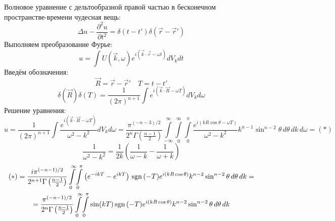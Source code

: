 Волновое уравнение с дельтообразной правой частью в бесконечном пространстве-времени чудесная вещь:
\[
	\Delta u - \frac{\partial^2 u}{\partial t^2} = \delta(t - t')\delta(\vec{r} - \vec{r}') 
\]
Выполняем преобразование Фурье:
\[
	u = \int U(\vec{k}, \omega) e^{i(\vec{k}\cdot\vec{r} - \omega t)} dV_k dt
\]
Введём обозначения:
\[
	\vec{R} = \vec{r} - \vec{r}' \quad T = t - t'
\]
\[
	\delta(\vec{R}) \delta(T) = \frac{1}{(2\pi)^{n + 1}} \int e^{i(\vec{k}\cdot\vec{R} - \omega T)} dV_k d\omega
\]
Решение уравнения:
\[
	u = \frac{1}{(2\pi)^{n + 1}} \int \frac{e^{i(\vec{k}\cdot\vec{R} - \omega T)}}{\omega^2 - k^2} dV_k d\omega =  
	\frac{\pi^{(- n - 3)/2}}{2^n\Gamma\left(\frac{n - 1}{2}\right)} 
	\int\limits_{-\infty}^{\infty}\!
	\int\limits_{0}^{\infty}\!
	\int\limits_{0}^{\pi}
	 \frac{e^{i(k R \cos \theta - \omega T)}}{\omega^2 - k^2} k^{n - 1} \sin^{n - 2} \theta\, d\theta\, dk\, d\omega = (*)
\]
\[
	\frac{1}{\omega^2 - k^2} = \frac{1}{2k} \left(\frac{1}{\omega - k} - \frac{1}{\omega + k} \right)
\]
\[
	\begin{gathered}
	(*) =
	\frac{i \pi^{(- n - 1)/2}}{2^{n + 1}\Gamma\left(\frac{n - 1}{2}\right)} 
	\int\limits_{0}^{\infty}\!
	\int\limits_{0}^{\pi}
	\left(e^{ - i k T}  - e^{i k T} \right) \mathrm{\,sgn}\,(-T)
	e^{i(k R \cos \theta)} 
	k^{n - 2} \sin^{n - 2} \theta\, d\theta\, dk
	= \\ =
	\frac{\pi^{(- n - 1)/2}}{2^{n}\Gamma\left(\frac{n - 1}{2}\right)} 
	\int\limits_{0}^{\infty}\!
	\int\limits_{0}^{\pi}
	\sin (kT) \mathrm{\,sgn}\,(-T)
	e^{i(k R \cos \theta)} 
	k^{n - 2} \sin^{n - 2} \theta\, d\theta\, dk
	\end{gathered} 
\]
